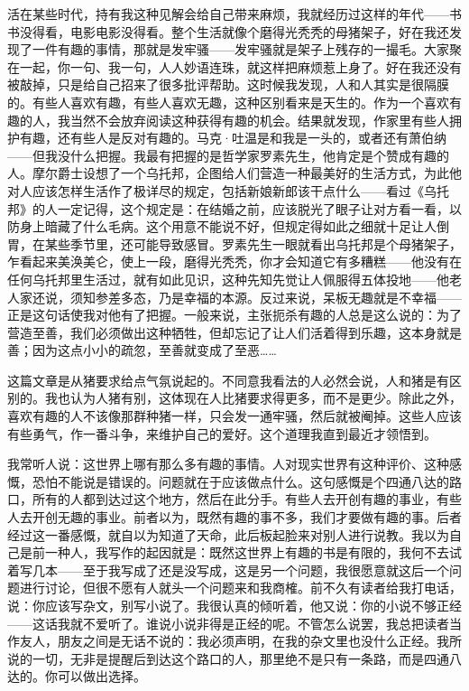 活在某些时代，持有我这种见解会给自己带来麻烦，我就经历过这样的年代——书书没得看，电影电影没得看。整个生活就像个磨得光秃秃的母猪架子，好在我还发现了一件有趣的事情，那就是发牢骚——发牢骚就是架子上残存的一撮毛。大家聚在一起，你一句、我一句，人人妙语连珠，就这样把麻烦惹上身了。好在我还没有被敲掉，只是给自己招来了很多批评帮助。这时候我发现，人和人其实是很隔膜的。有些人喜欢有趣，有些人喜欢无趣，这种区别看来是天生的。作为一个喜欢有趣的人，我当然不会放弃阅读这种获得有趣的机会。结果就发现，作家里有些人拥护有趣，还有些人是反对有趣的。马克·吐温是和我是一头的，或者还有萧伯纳——但我没什么把握。我最有把握的是哲学家罗素先生，他肯定是个赞成有趣的人。摩尔爵士设想了一个乌托邦，企图给人们营造一种最美好的生活方式，为此他对人应该怎样生活作了极详尽的规定，包括新娘新郎该干点什么——看过《乌托邦》的人一定记得，这个规定是：在结婚之前，应该脱光了眼子让对方看一看，以防身上暗藏了什么毛病。这个用意不能说不好，但规定得如此之细就十足让人倒胃，在某些季节里，还可能导致感冒。罗素先生一眼就看出乌托邦是个母猪架子，乍看起来美涣美仑，使上一段，磨得光秃秃，你才会知道它有多糟糕——他没有在任何乌托邦里生活过，就有如此见识，这种先知先觉让人佩服得五体投地——他老人家还说，须知参差多态，乃是幸福的本源。反过来说，呆板无趣就是不幸福——正是这句话使我对他有了把握。一般来说，主张扼杀有趣的人总是这么说的：为了营造至善，我们必须做出这种牺牲，但却忘记了让人们活着得到乐趣，这本身就是善；因为这点小小的疏忽，至善就变成了至恶…… 

这篇文章是从猪要求给点气氛说起的。不同意我看法的人必然会说，人和猪是有区别的。我也认为人猪有别，这体现在人比猪要求得更多，而不是更少。除此之外，喜欢有趣的人不该像那群种猪一样，只会发一通牢骚，然后就被阉掉。这些人应该有些勇气，作一番斗争，来维护自己的爱好。这个道理我直到最近才领悟到。 

我常听人说：这世界上哪有那么多有趣的事情。人对现实世界有这种评价、这种感慨，恐怕不能说是错误的。问题就在于应该做点什么。这句感慨是个四通八达的路口，所有的人都到达过这个地方，然后在此分手。有些人去开创有趣的事业，有些人去开创无趣的事业。前者以为，既然有趣的事不多，我们才要做有趣的事。后者经过这一番感慨，就自以为知道了天命，此后板起脸来对别人进行说教。我以为自己是前一种人，我写作的起因就是：既然这世界上有趣的书是有限的，我何不去试着写几本——至于我写成了还是没写成，这是另一个问题，我很愿意就这后一个问题进行讨论，但很不愿有人就头一个问题来和我商榷。前不久有读者给我打电话，说：你应该写杂文，别写小说了。我很认真的倾听着，他又说：你的小说不够正经——这话我就不爱听了。谁说小说非得是正经的呢。不管怎么说罢，我总把读者当作友人，朋友之间是无话不说的：我必须声明，在我的杂文里也没什么正经。我所说的一切，无非是提醒后到达这个路口的人，那里绝不是只有一条路，而是四通八达的。你可以做出选择。

